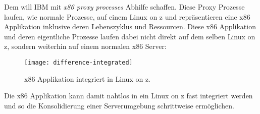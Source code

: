 Dem will IBM mit \textit{x86 proxy processes} Abhilfe schaffen.
Diese Proxy Prozesse laufen, wie normale Prozesse, auf einem Linux on z und repräsentieren eine x86 Applikation inklusive deren Lebenszyklus und Ressourcen.
Diese x86 Applikation und deren eigentliche Prozesse laufen dabei nicht direkt auf dem selben Linux on z, sondern weiterhin auf einem normalen x86 Server:

\begin{figure}[h!]
\centering
\texttt{[image: difference-integrated]}
\caption{x86 Applikation integriert in Linux on z\cite{x86OnLinuxOnZ}.}
\label{fig:LinuxOnZ}
\end{figure}

Die x86 Applikation kann damit nahtlos in ein Linux on z fast integriert werden und so die Konsolidierung einer Serverumgebung schrittweise ermöglichen.\cite{x86OnLinuxOnZ}
